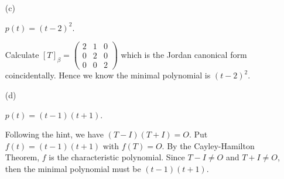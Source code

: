 \begin{Exercise}
\begin{enumerate}[(a)]
		\item[(c)]
		\begin{answer}
			$p(t) = (t-2)^2$. 	
		\end{answer}
		\begin{solution}
			Calculate $[T]_{\beta} = \begin{pmatrix}
			2 & 1 & 0 \\
			0 & 2 & 0 \\
			0 & 0 & 2
			\end{pmatrix}$ which is the Jordan canonical form coincidentally. 
			Hence we know the minimal polynomial is $(t-2)^2$.
		\end{solution}
		\item[(d)]
		\begin{answer}
			$p(t) = (t-1)(t+1)$.
		\end{answer}
		\begin{solution}
			Following the hint, we have $(T-I)(T+I) = O$.
			Put $f(t) = (t-1)(t+1)$ with $f(T) = O$.
			By the Cayley-Hamilton Theorem, $f$ is the characteristic polynomial.
			Since $T-I \neq O$ and $T+I \neq O$, then the minimal polynomial must be $(t-1)(t+1)$.
		\end{solution}
	\end{enumerate}
\end{Exercise} 